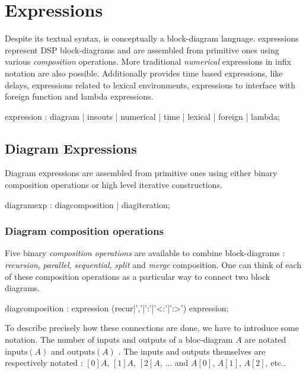 \section{Expressions}

Despite its textual syntax, \faust is conceptually a block-diagram language. \faust expressions represent DSP block-diagrams and are assembled from primitive ones using various \textit{composition} operations. More traditional \textit{numerical} expressions in infix notation are also possible. Additionally \faust provides time based expressions, like delays, expressions related to lexical environments, expressions to interface with foreign function and lambda expressions.

\begin{rail}
expression : diagram | insouts | numerical | time | lexical | foreign | lambda;
\end{rail}
  
\subsection{Diagram Expressions}

Diagram expressions are assembled from primitive ones using either binary composition operations or high level iterative constructions.
 
\begin{rail}
diagramexp : diagcomposition | diagiteration;
\end{rail}

\subsubsection{Diagram composition operations} 
Five binary \emph{composition operations} are available to combine block-diagrams : \textit{recursion}, \textit{parallel}, \textit{sequential}, \textit{split} and \textit{merge} composition. One can think of each  of these composition operations as a particular way to connect two block diagrams. 

\begin{rail}
diagcomposition : expression (recur|','|':'|'<:'|':>') expression;
\end{rail}

To describe precisely how these connections are done, we have to introduce some notation.  The number of inputs and outputs of a bloc-diagram $A$ are notated $\mathrm{inputs}(A)$ and $\mathrm{outputs}(A)$ . The inputs and outputs themselves are respectively notated : $[0]A$, $[1]A$, $[2]A$, $\ldots$ and $A[0]$, $A[1]$, $A[2]$, etc.. 

